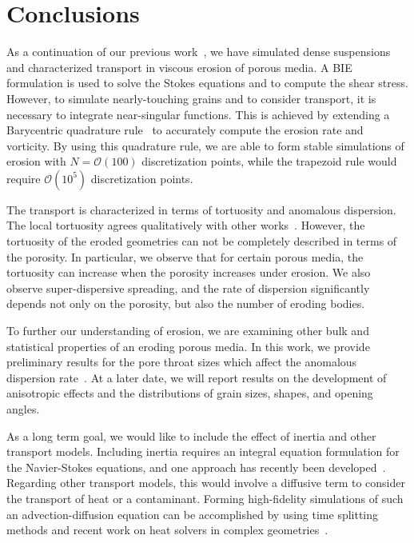 \documentclass[preprint,10pt]{elsarticle}
\begin{document}
\section{Conclusions}
\label{sec:conclusions}
As a continuation of our previous work~\cite{qua-moo2018}, we have
simulated dense suspensions and characterized transport in viscous
erosion of porous media. A BIE formulation is used to solve the Stokes
equations and to compute the shear stress. However, to simulate
nearly-touching grains and to consider transport, it is necessary to
integrate near-singular functions. This is achieved by extending a
Barycentric quadrature rule~\cite{bar-wu-vee2015} to accurately compute
the erosion rate and vorticity. By using this quadrature rule, we are
able to form stable simulations of erosion with $N = \mathcal{O}(100)$
discretization points, while the trapezoid rule would require
$\mathcal{O}(10^5)$ discretization points.

The transport is characterized in terms of tortuosity and anomalous
dispersion. The local tortuosity agrees qualitatively with
other works~\cite{mat-kha-koz2008}. However, the tortuosity of the
eroded geometries can not be completely described in terms of the
porosity. In particular, we observe that for certain porous media, the
tortuosity can increase when the porosity increases under erosion. We
also observe super-dispersive spreading, and the rate of dispersion
significantly depends not only on the porosity, but also the number of
eroding bodies.

To further our understanding of erosion, we are examining other bulk and
statistical properties of an eroding porous media. In this work, we
provide preliminary results for the pore throat sizes which affect the
anomalous dispersion rate~\cite{dea-qua-bir-jua2018}.  At a later date,
we will report results on the  development of anisotropic effects and
the distributions of grain sizes, shapes, and opening angles.

As a long term goal, we would like to include the effect of inertia and
other transport models. Including inertia requires an integral equation
formulation for the Navier-Stokes equations, and one approach has
recently been developed~\cite{kli-ask-kro2019}. Regarding other
transport models, this would involve a diffusive term to consider the
transport of heat or a contaminant. Forming high-fidelity simulations of
such an advection-diffusion equation can be accomplished by using time
splitting methods and recent work on heat solvers in complex
geometries~\cite{fry-kro-tor2019}.
\end{document}
